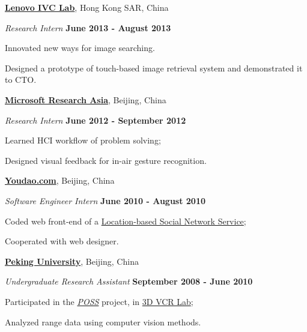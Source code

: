 \documentclass[10pt]{article}
\newenvironment{outerlist}[1][\enskip\textbullet]%
        {\begin{itemize}[#1]}{\end{itemize}%
         \vspace{-.6\baselineskip}}
\newenvironment{innerlist}[1][\enskip\textbullet]%
        {\begin{compactitem}[#1]}{\end{compactitem}}
\newcommand{\blankline}{\quad\pagebreak[2]}
\begin{document}
\blankline

\href{http://www.lenovo.com}{\textbf{Lenovo IVC Lab}}, \hfill
Hong Kong SAR, China
\begin{outerlist}

\item[] \textit{Research Intern}%
        \hfill \textbf{June 2013 - August 2013}
\begin{innerlist}
\item Innovated new ways for image searching.
\item Designed a prototype of touch-based image retrieval system and demonstrated it to CTO.
\end{innerlist}
\end{outerlist}

\blankline

\href{http://research.microsoft.com/hci}{\textbf{Microsoft Research Asia}}, \hfill
Beijing, China
\begin{outerlist}

\item[] \textit{Research Intern}%
        \hfill \textbf{June 2012 - September 2012}
\begin{innerlist}
\item Learned HCI workflow of problem solving;
\item Designed visual feedback for in-air gesture recognition.
\end{innerlist}
\end{outerlist}

\blankline

\href{http://www.youdao.com/}{\textbf{Youdao.com}}, \hfill
Beijing, China
\begin{outerlist}

\item[] \textit{Software Engineer Intern}%
        \hfill \textbf{June 2010 - August 2010}
\begin{innerlist}
\item Coded web front-end of a \href{http://bafang.163.com}{Location-based Social Network Service};
\item Cooperated with web designer.
\end{innerlist}
\end{outerlist}

\blankline

\href{http://www.pku.edu.cn}{\textbf{Peking University}}, \hfill
Beijing, China
\begin{outerlist}

\item[] \textit{Undergraduate Research Assistant}%
        \hfill \textbf{September 2008 - June 2010}
\begin{innerlist}
\item Participated in the \href{http://www.poss.pku.edu.cn/}{\emph{POSS}} project, in
        \href{http://www.cis.pku.edu.cn/vision/3DVCR/3DVCR_E.html}{3D VCR Lab};
\item Analyzed range data using computer vision methods.
\end{innerlist}

\end{outerlist}
\end{document}
